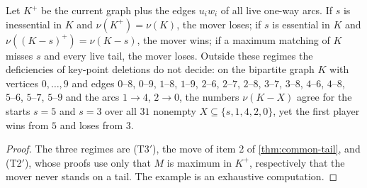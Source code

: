 \documentclass[final]{siamart0516}
\numberwithin{theorem}{section}
\numberwithin{equation}{section}
\theoremstyle{siamnonum}
\theoremstyle{plain}
\begin{document}
\begin{proposition}\label{prop:two-arcs}
Let $K^{+}$ be the current graph plus the edges $u_iw_i$ of all live one-way arcs. If $s$ is inessential in $K$ and $\nu(K^{+})=\nu(K)$, the mover loses; if $s$ is essential in $K$ and $\nu((K-s)^{+})=\nu(K-s)$, the mover wins; if a maximum matching of $K$ misses $s$ and every live tail, the mover loses. Outside these regimes the deficiencies of key-point deletions do not decide: on the bipartite graph $K$ with vertices $0,\dots,9$ and edges $0\text{--}8$, $0\text{--}9$, $1\text{--}8$, $1\text{--}9$, $2\text{--}6$, $2\text{--}7$, $2\text{--}8$, $3\text{--}7$, $3\text{--}8$, $4\text{--}6$, $4\text{--}8$, $5\text{--}6$, $5\text{--}7$, $5\text{--}9$ and the arcs $1\to4$, $2\to0$, the numbers $\nu(K-X)$ agree for the starts $s=5$ and $s=3$ over all $31$ nonempty $X\subseteq\{s,1,4,2,0\}$, yet the first player wins from $5$ and loses from $3$.
\end{proposition}
\begin{proof}
The three regimes are (T3$'$), the move of item 2 of \cref{thm:common-tail}, and (T2$'$), whose proofs use only that $M$ is maximum in $K^{+}$, respectively that the mover never stands on a tail. The example is an exhaustive computation.
\end{proof}
\end{document}
